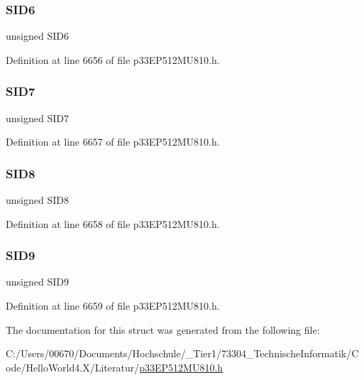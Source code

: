 \subsubsection{\texorpdfstring{S\+I\+D6}{SID6}}
{\footnotesize\ttfamily unsigned S\+I\+D6}



Definition at line 6656 of file p33\+E\+P512\+M\+U810.\+h.

\mbox{\label{structtag_c2_r_x_f8_s_i_d_b_i_t_s_a34097fb76decd431701fa2d86a22328e}} 
\subsubsection{\texorpdfstring{S\+I\+D7}{SID7}}
{\footnotesize\ttfamily unsigned S\+I\+D7}



Definition at line 6657 of file p33\+E\+P512\+M\+U810.\+h.

\mbox{\label{structtag_c2_r_x_f8_s_i_d_b_i_t_s_afe74894633244fdb0b0c01b4e8c522e7}} 
\subsubsection{\texorpdfstring{S\+I\+D8}{SID8}}
{\footnotesize\ttfamily unsigned S\+I\+D8}



Definition at line 6658 of file p33\+E\+P512\+M\+U810.\+h.

\mbox{\label{structtag_c2_r_x_f8_s_i_d_b_i_t_s_a33587704948067005c2a6a3ccc503c99}} 
\subsubsection{\texorpdfstring{S\+I\+D9}{SID9}}
{\footnotesize\ttfamily unsigned S\+I\+D9}



Definition at line 6659 of file p33\+E\+P512\+M\+U810.\+h.



The documentation for this struct was generated from the following file\+:\begin{DoxyCompactItemize}
\item 
C\+:/\+Users/00670/\+Documents/\+Hochschule/\+\_\+\+Tier1/73304\+\_\+\+Technische\+Informatik/\+Code/\+Hello\+World4.\+X/\+Literatur/\hyperlink{p33_e_p512_m_u810_8h}{p33\+E\+P512\+M\+U810.\+h}\end{DoxyCompactItemize}
